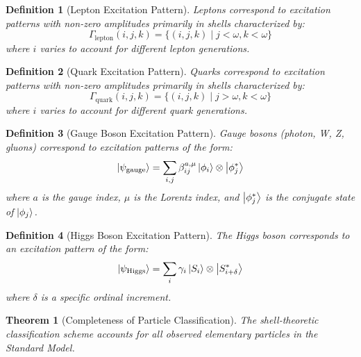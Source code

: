 \documentclass[12pt,a4paper]{article}
\newtheorem{theorem}{Theorem}[section]
\newtheorem{definition}{Definition}[section]
\begin{document}
\begin{definition}[Lepton Excitation Pattern]
\label{def:lepton-pattern}
Leptons correspond to excitation patterns with non-zero amplitudes primarily in shells characterized by:
\begin{equation}
\Gamma_{\text{lepton}}(i,j,k) = \{(i,j,k) \mid j < \omega, k < \omega\}
\end{equation}
where $i$ varies to account for different lepton generations.
\end{definition}

\begin{definition}[Quark Excitation Pattern]
\label{def:quark-pattern}
Quarks correspond to excitation patterns with non-zero amplitudes primarily in shells characterized by:
\begin{equation}
\Gamma_{\text{quark}}(i,j,k) = \{(i,j,k) \mid j > \omega, k < \omega\}
\end{equation}
where $i$ varies to account for different quark generations.
\end{definition}

\begin{definition}[Gauge Boson Excitation Pattern]
\label{def:gauge-boson-pattern}
Gauge bosons (photon, W, Z, gluons) correspond to excitation patterns of the form:
\begin{equation}
\ket{\psi_{\text{gauge}}} = \sum_{i,j} \beta_{ij}^{a, \mu} \ket{\phi_i} \otimes \ket{\phi_j^*}
\end{equation}
where $a$ is the gauge index, $\mu$ is the Lorentz index, and $\ket{\phi_j^*}$ is the conjugate state of $\ket{\phi_j}$.
\end{definition}

\begin{definition}[Higgs Boson Excitation Pattern]
\label{def:higgs-pattern}
The Higgs boson corresponds to an excitation pattern of the form:
\begin{equation}
\ket{\psi_{\text{Higgs}}} = \sum_i \gamma_i \ket{S_i} \otimes \ket{S_{i+\delta}^*}
\end{equation}
where $\delta$ is a specific ordinal increment.
\end{definition}

\begin{theorem}[Completeness of Particle Classification]
\label{thm:classification-completeness}
The shell-theoretic classification scheme accounts for all observed elementary particles in the Standard Model.
\end{theorem}
\end{document}

